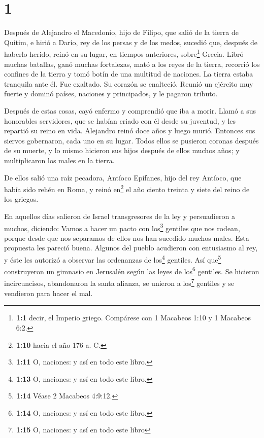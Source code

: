 \hypertarget{section}{%
\section{1}\label{section}}

 Después de Alejandro el Macedonio, hijo de Filipo, que
salió de la tierra de Quitim, e hirió a Darío, rey de los persas y de
los medos, sucedió que, después de haberlo herido, reinó en su lugar, en
tiempos anteriores, sobre\footnote{\textbf{1:1} decir, el Imperio
  griego. Compárese con 1 Macabeos 1:10 y 1 Macabeos 6:2.} Grecia.
 Libró muchas batallas, ganó muchas fortalezas, mató a los
reyes de la tierra,  recorrió los confines de la tierra y
tomó botín de una multitud de naciones. La tierra estaba tranquila ante
él. Fue exaltado. Su corazón se enalteció.  Reunió un
ejército muy fuerte y dominó países, naciones y principados, y le
pagaron tributo.

 Después de estas cosas, cayó enfermo y comprendió que iba
a morir.  Llamó a sus honorables servidores, que se habían
criado con él desde su juventud, y les repartió su reino en vida.
 Alejandro reinó doce años y luego murió. 
Entonces sus siervos gobernaron, cada uno en su lugar. 
Todos ellos se pusieron coronas después de su muerte, y lo mismo
hicieron sus hijos después de ellos muchos años; y multiplicaron los
males en la tierra.

 De ellos salió una raíz pecadora, Antíoco Epífanes, hijo
del rey Antíoco, que había sido rehén en Roma, y reinó en\footnote{\textbf{1:10}
  hacia el año 176 a. C.} el año ciento treinta y siete del reino de los
griegos.

 En aquellos días salieron de Israel transgresores de la
ley y persuadieron a muchos, diciendo: Vamos a hacer un pacto con
los\footnote{\textbf{1:11} O, naciones: y así en todo este libro.}
gentiles que nos rodean, porque desde que nos separamos de ellos nos han
sucedido muchos males.  Esta propuesta les pareció buena.
 Algunos del pueblo acudieron con entusiasmo al rey, y
éste les autorizó a observar las ordenanzas de los\footnote{\textbf{1:13}
  O, naciones: y así en todo este libro.} gentiles.  Así
que\footnote{\textbf{1:14} Véase 2 Macabeos 4:9:12.} construyeron un
gimnasio en Jerusalén según las leyes de los\footnote{\textbf{1:14} O,
  naciones: y así en todo este libro.} gentiles.  Se
hicieron incircuncisos, abandonaron la santa alianza, se unieron a
los\footnote{\textbf{1:15} O, naciones: y así en todo este libro}
gentiles y se vendieron para hacer el mal.

